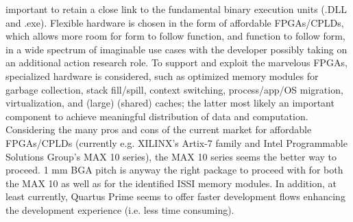 \documentclass[11pt]{article}
\begin{document}
important to retain a close link to the fundamental binary execution units (.DLL and .exe). Flexible hardware is chosen in the form of affordable FPGAs/CPLDs, which allows more room for form to follow function, and function to follow form, in a wide spectrum of imaginable use cases with the developer possibly taking on an additional action research role. To support and exploit the marvelous FPGAs, specialized hardware is considered, such as optimized memory modules for garbage collection, stack fill/spill, context switching, process/app/OS migration, virtualization, and (large) (shared) caches; the latter most likely an important component to achieve meaningful distribution of data and computation. Considering the many pros and cons of the current market for affordable FPGAs/CPLDs (currently e.g. XILINX's Artix-7 family and Intel Programmable Solutions Group's MAX 10 series), the MAX 10 series seems the better way to proceed. 1 mm BGA pitch is anyway the right package to proceed with for both the MAX 10 as well as for the identified ISSI memory modules. In addition, at least currently, Quartus Prime seems to offer faster development flows enhancing the development experience (i.e. less time consuming).
\end{document}
